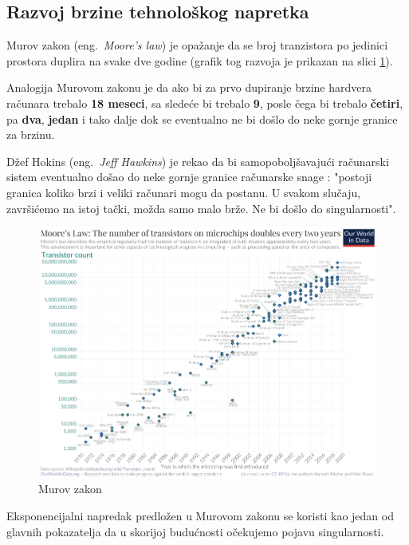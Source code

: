 \documentclass[a4paper]{article}
\begin{document}
\subsection{Razvoj brzine tehnološkog napretka}

Murov zakon (eng.~{\em Moore's law}) je opažanje da se broj tranzistora po jedinici prostora duplira na svake dve godine (grafik tog razvoja je prikazan na slici \ref{fig:grafik}). 

Analogija Murovom zakonu je da ako bi za prvo dupiranje brzine hardvera računara trebalo \textbf{18 meseci}, sa sledeće bi trebalo \textbf{9}, posle čega bi trebalo \textbf{četiri}, pa \textbf{dva}, \textbf{jedan} i tako dalje dok se eventualno ne bi došlo do neke gornje granice za brzinu.

Džef Hokins (eng.~{\em Jeff Hawkins}) je rekao da bi samopoboljšavajući računarski sistem eventualno došao do neke gornje granice računarske snage : "postoji granica koliko brzi i veliki računari mogu da postanu. U svakom slučaju, završićemo na istoj tački, možda samo malo brže. Ne bi došlo do singularnosti". \cite{mog-5}

\begin{figure}[h!]
\begin{center}
\includegraphics[scale=0.35]{moore.png}
\end{center}
\caption{Murov zakon}
\label{fig:grafik}
\end{figure}

Eksponencijalni napredak predložen u Murovom zakonu se koristi kao jedan od glavnih pokazatelja da u skorijoj budućnosti očekujemo pojavu singularnosti.
\end{document}
